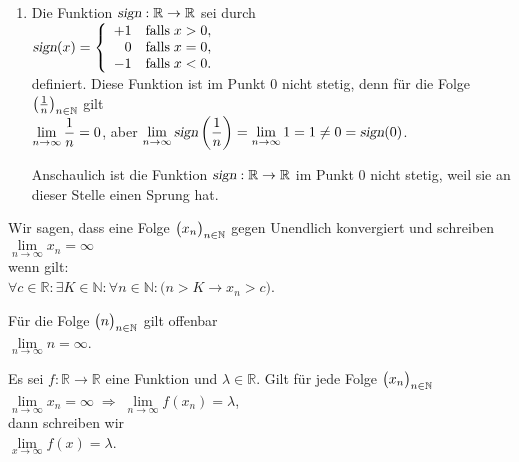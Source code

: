 \begin{enumerate}
\item Die Funktion $\textsl{sign}:\mathbb{R} \rightarrow \mathbb{R}$ sei durch
      \\[0.2cm]
      \hspace*{1.3cm}      
      $\textsl{sign}(x) = \left\{
       \begin{array}{rl}
        +1 & \mbox{falls}\; x > 0, \\
         0 & \mbox{falls}\; x = 0, \\
        -1 & \mbox{falls}\; x < 0. \\
       \end{array}\right.
      $
      \\[0.2cm]
      definiert. Diese Funktion ist im Punkt $0$ nicht stetig, denn f\"ur die Folge
      $\bigl(\frac{1}{n}\bigr)_{n\in\mathbb{N}}$ gilt
      \\[0.2cm]
      \hspace*{1.3cm}      
      $\displaystyle \lim\limits_{n\rightarrow\infty} \frac{1}{n} = 0$, \quad aber \quad
      $\displaystyle \lim\limits_{n\rightarrow\infty} \textsl{sign}\left(\frac{1}{n}\right) =
       \lim\limits_{n\rightarrow\infty} 1 = 1 \not= 0 = \textsl{sign}(0)$. 

       Anschaulich ist die Funktion $\textsl{sign}:\mathbb{R} \rightarrow \mathbb{R}$  im Punkt
       0 nicht stetig, weil sie an dieser Stelle einen Sprung hat.
       \eox
\end{enumerate}

\begin{Definition}
Wir sagen, dass eine Folge  $\bigl(x_n\bigr)_{n\in\mathbb{N}}$ gegen Unendlich konvergiert und schreiben 
\\[0.2cm]
\hspace*{1.3cm}      
$\lim\limits_{n\rightarrow\infty} x_n = \infty$
\\[0.2cm]
wenn gilt:
\\[0.2cm]
\hspace*{1.3cm}      
$\forall c \in \mathbb{R}: \exists K \in \mathbb{N}: \forall n \in \mathbb{N}: \bigl(n > K \rightarrow x_n > c\bigr)$.
\eod
\end{Definition}

\example  
F\"ur die Folge $\bigl(n\bigr)_{n\in\mathbb{N}}$ gilt offenbar 
\\[0.2cm]
\hspace*{1.3cm}      
$\lim\limits_{n\rightarrow\infty} n = \infty$.
\eox

\begin{Definition}
Es sei $f:\mathbb{R} \rightarrow \mathbb{R}$ eine Funktion und $\lambda\in \mathbb{R}$.
Gilt f\"ur jede Folge $\bigl(x_n\bigr)_{n\in\mathbb{N}}$
\\[0.2cm]
\hspace*{1.3cm}      
$\lim\limits_{n\rightarrow\infty} x_n = \infty \;\Rightarrow\;
     \lim\limits_{n\rightarrow\infty} f(x_n) = \lambda$,
\\[0.2cm]
dann schreiben wir 
\\[0.2cm]
\hspace*{1.3cm}      
$\lim\limits_{x\rightarrow\infty} f(x) = \lambda$.
\eod
\end{Definition}

